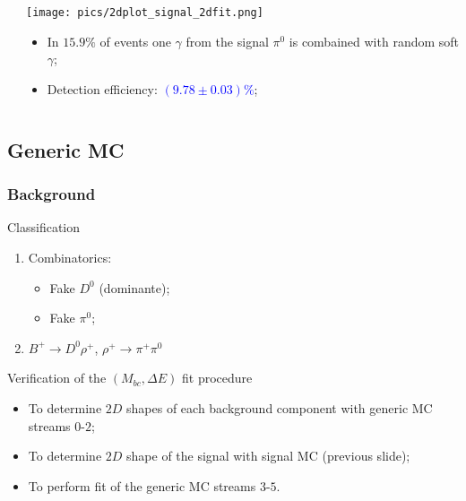 \documentclass[10 pt,compress,mathserif]{beamer}
\begin{document}
\begin{frame}
\begin{small}
\begin{columns}
\begin{column}{0.66\textwidth}
  \end{column}
  \begin{column}{0.34\textwidth}
   \begin{center}
    \texttt{[image: pics/2dplot\_signal\_2dfit.png]}
   \end{center}
     \begin{itemize}
      \item In $15.9\%$ of events one $\gamma$ from the signal $\pi^0$ is combained with random soft $\gamma$;
      \item Detection efficiency: \textcolor{blue}{$(9.78\pm0.03)\%$};
     \end{itemize}
  \end{column}
 \end{columns}
 
 \end{small}
\end{frame}

\subsection{Generic MC}
\begin{frame}
 \frametitle{Background}
 \begin{block}{Classification}
  \begin{enumerate}
   \item Combinatorics:
    \begin{itemize}
     \item Fake $D^0$ (dominante);
     \item Fake $\pi^0$;
    \end{itemize}
   \item $B^+\to D^0\rho^+$, $\rho^+\to\pi^+\pi^0$
  \end{enumerate}
 \end{block}

 \begin{block}{Verification of the $(M_{bc},\Delta E)$ fit procedure}
  \begin{itemize}
   \item To determine $2D$ shapes of each background component with generic MC streams $0$-$2$;
   \item To determine $2D$ shape of the signal with signal MC (previous slide);
   \item To perform fit of the generic MC streams $3$-$5$.
  \end{itemize}
 \end{block}
\end{frame}
\end{document}
